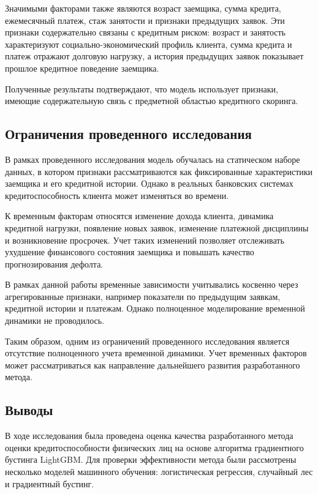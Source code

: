 Значимыми факторами также являются возраст заемщика, сумма кредита, ежемесячный платеж, стаж занятости и признаки предыдущих заявок.
Эти признаки содержательно связаны с кредитным риском: возраст и занятость характеризуют социально-экономический профиль клиента, сумма кредита и платеж отражают долговую нагрузку, а история предыдущих заявок показывает прошлое кредитное поведение заемщика.

Полученные результаты подтверждают, что модель использует признаки, имеющие содержательную связь с предметной областью кредитного скоринга.

\subsection{Ограничения проведенного исследования}

В рамках проведенного исследования модель обучалась на статическом наборе данных, в котором признаки рассматриваются как фиксированные характеристики заемщика и его кредитной истории. Однако в реальных банковских системах кредитоспособность клиента может изменяться во времени.

К временным факторам относятся изменение дохода клиента, динамика кредитной нагрузки, появление новых заявок, изменение платежной дисциплины и возникновение просрочек. Учет таких изменений позволяет отслеживать ухудшение финансового состояния заемщика и повышать качество прогнозирования дефолта.

В рамках данной работы временные зависимости учитывались косвенно через агрегированные признаки, например показатели по предыдущим заявкам, кредитной истории и платежам. Однако полноценное моделирование временной динамики не проводилось.

Таким образом, одним из ограничений проведенного исследования является отсутствие полноценного учета временной динамики. Учет временных факторов может рассматриваться как направление дальнейшего развития разработанного метода.


\subsection*{Выводы}

В ходе исследования была проведена оценка качества разработанного метода оценки кредитоспособности физических лиц на основе алгоритма градиентного бустинга LightGBM. Для проверки эффективности метода были рассмотрены несколько моделей машинного обучения: логистическая регрессия, случайный лес и градиентный бустинг.


